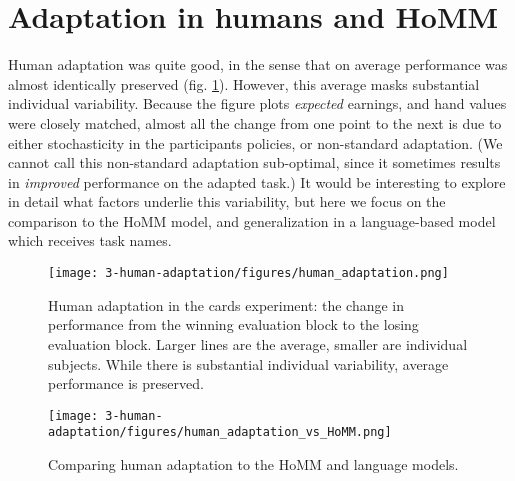 \section{Adaptation in humans and HoMM}
Human adaptation was quite good, in the sense that on average performance was almost identically preserved (fig. \ref{fig:human_cards_adaptation_results}). However, this average masks substantial individual variability. Because the figure plots \emph{expected} earnings, and hand values were closely matched, almost all the change from one point to the next is due to either stochasticity in the participants policies, or non-standard adaptation. (We cannot call this non-standard adaptation sub-optimal, since it sometimes results in \emph{improved} performance on the adapted task.) It would be interesting to explore in detail what factors underlie this variability, but here we focus on the comparison to the HoMM model, and generalization in a language-based model which receives task names. \par  
\begin{figure}
\centering
\texttt{[image: 3-human-adaptation/figures/human\_adaptation.png]}
\caption[Human adaptation in the cards experiment.]{Human adaptation in the cards experiment: the change in performance from the winning evaluation block to the losing evaluation block. Larger lines are the average, smaller are individual subjects. While there is substantial individual variability, average performance is preserved.} \label{fig:human_cards_adaptation_results}
\end{figure}

\begin{figure}
\centering
\texttt{[image: 3-human-adaptation/figures/human\_adaptation\_vs\_HoMM.png]}
\caption{Comparing human adaptation to the HoMM and language models.}\label{fig:human_cards_homm_results}
\end{figure}

